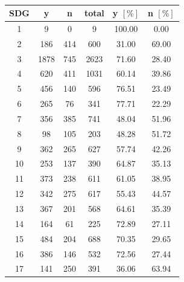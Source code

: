 \documentclass{article}
\begin{document}
\begin{minipage}[H]{0.45\textwidth}
\begin{table}[H]
\centering 
 \begin{tabular}{cccccc}
 \toprule
 SDG & y & n & total & y $[\%]$ & n $[\%]$ \\
 \hline
 1 & 9 & 0 & 9 & 100.00 & 0.00 \\
 2 & 186 & 414 & 600 & 31.00 & 69.00 \\
 3 & 1878 & 745 & 2623 & 71.60 & 28.40 \\
 4 & 620 & 411 & 1031 & 60.14 & 39.86 \\
 5 & 456 & 140 & 596 & 76.51 & 23.49 \\
 6 & 265 & 76 & 341 & 77.71 & 22.29 \\
 7 & 356 & 385 & 741 & 48.04 & 51.96 \\
 8 & 98 & 105 & 203 & 48.28 & 51.72 \\
 9 & 362 & 265 & 627 & 57.74 & 42.26 \\
 10 & 253 & 137 & 390 & 64.87 & 35.13 \\
 11 & 373 & 238 & 611 & 61.05 & 38.95 \\
 12 & 342 & 275 & 617 & 55.43 & 44.57 \\
 13 & 367 & 201 & 568 & 64.61 & 35.39 \\
 14 & 164 & 61 & 225 & 72.89 & 27.11 \\
 15 & 484 & 204 & 688 & 70.35 & 29.65 \\
 16 & 386 & 146 & 532 & 72.56 & 27.44 \\
 17 & 141 & 250 & 391 & 36.06 & 63.94 \\
 \bottomrule
\end{tabular}
\caption{}
\label{precisionv4survold}
\end{table}
\end{minipage}
\begin{minipage}[H]{0.1\textwidth}
\hspace{\textwidth}
\end{minipage}
\end{document}

